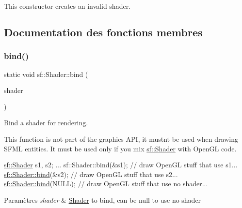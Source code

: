 This constructor creates an invalid shader. 

\subsection{Documentation des fonctions membres}
\mbox{\label{classsf_1_1Shader_a09778f78afcbeb854d608c8dacd8ea30}} 
\subsubsection{\texorpdfstring{bind()}{bind()}}
{\footnotesize\ttfamily static void sf\+::\+Shader\+::bind (\begin{DoxyParamCaption}\item[{const \hyperlink{classsf_1_1Shader}{Shader} $\ast$}]{shader }\end{DoxyParamCaption})\hspace{0.3cm}{\ttfamily [static]}}



Bind a shader for rendering. 

This function is not part of the graphics A\+PI, it mustn\textquotesingle{}t be used when drawing S\+F\+ML entities. It must be used only if you mix \hyperlink{classsf_1_1Shader}{sf\+::\+Shader} with Open\+GL code.


\begin{DoxyCode}
\hyperlink{classsf_1_1Shader}{sf::Shader} s1, s2;
...
sf::Shader::bind(&s1);
\textcolor{comment}{// draw OpenGL stuff that use s1...}
\hyperlink{classsf_1_1Shader_a09778f78afcbeb854d608c8dacd8ea30}{sf::Shader::bind}(&s2);
\textcolor{comment}{// draw OpenGL stuff that use s2...}
\hyperlink{classsf_1_1Shader_a09778f78afcbeb854d608c8dacd8ea30}{sf::Shader::bind}(NULL);
\textcolor{comment}{// draw OpenGL stuff that use no shader...}
\end{DoxyCode}



\begin{DoxyParams}{Paramètres}
{\em shader} & \hyperlink{classsf_1_1Shader}{Shader} to bind, can be null to use no shader \\
\hline
\end{DoxyParams}
\mbox{\label{classsf_1_1Shader_ac14d0bf7afe7b6bb415d309f9c707188}} 
